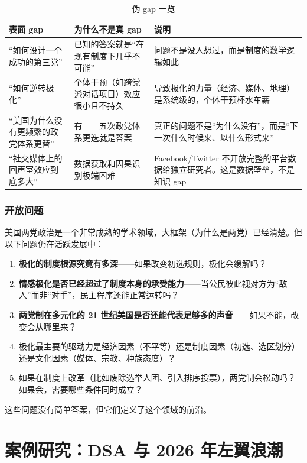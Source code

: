\documentclass[12pt,a4paper]{ctexart}
\begin{document}
\begin{table}[h]
\centering
\caption{伪 gap 一览}
\begin{tabular}{@{}lp{5.8cm}p{7.4cm}@{}}
\toprule
\textbf{表面 gap} & \textbf{为什么不是真 gap} & \textbf{说明} \\
\midrule
``如何设计一个成功的第三党'' & 已知的答案就是``在现有制度下几乎不可能'' & 问题不是没人想过，而是制度的数学逻辑如此 \\
``如何逆转极化'' & 个体干预（如跨党派对话项目）效应很小且不持久 & 导致极化的力量（经济、媒体、地理）是系统级的，个体干预杯水车薪 \\
``美国为什么没有更频繁的政党体系更替'' & 有——五次政党体系更迭就是答案 & 真正的问题不是``为什么没有''，而是``下一次什么时候来、以什么形式来'' \\
``社交媒体上的回声室效应到底多大'' & 数据获取和因果识别极端困难 & Facebook/Twitter 不开放完整的平台数据给独立研究者。这是数据壁垒，不是知识 gap \\
\bottomrule
\end{tabular}
\end{table}

\section{开放问题}

美国两党政治是一个非常成熟的学术领域，大框架（为什么是两党）已经清楚。但以下问题仍在活跃发展中：

\begin{enumerate}
  \item \textbf{极化的制度根源究竟有多深}——如果改变初选规则，极化会缓解吗？
  \item \textbf{情感极化是否已经超过了制度本身的承受能力}——当公民彼此视对方为``敌人''而非``对手''，民主程序还能正常运转吗？
  \item \textbf{两党制在多元化的 21 世纪美国是否还能代表足够多的声音}——如果不能，改变会从哪里来？
  \item 极化最主要的驱动力是经济因素（不平等）还是制度因素（初选、选区划分）还是文化因素（媒体、宗教、种族态度）？
  \item 如果在制度上改革（比如废除选举人团、引入排序投票），两党制会松动吗？如果会，需要哪些条件同时成立？
\end{enumerate}

这些问题没有简单答案，但它们定义了这个领域的前沿。

\clearpage

\part{案例研究：DSA 与 2026 年左翼浪潮}
\end{document}

